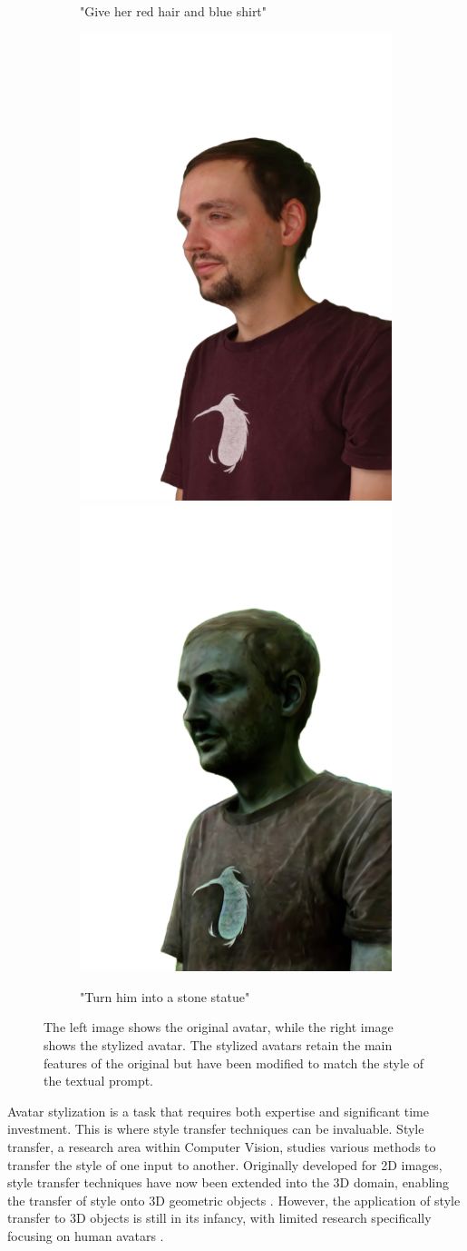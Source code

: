 \begin{figure}[ht]
\begin{subfigure}{0.40\linewidth}
		\caption{"Give her red hair and blue shirt"}
	\end{subfigure}
	\begin{subfigure}{0.40\linewidth}
		\includegraphics[width=0.45\linewidth]{Figures/results/initials/simon/27_render.png}
		\includegraphics[width=0.45\linewidth]{Figures/results/high/simon_stone/27_render.png}
		\caption{"Turn him into a stone statue"}
	\end{subfigure}
	\caption{The left image shows the original avatar, while the right image shows the stylized avatar. The stylized avatars retain the main features of the original but have been modified to match the style of the textual prompt.}
	\label{fig:introduction_stylization}
\end{figure}

Avatar stylization is a task that requires both expertise and significant time investment. This is where style transfer techniques can be invaluable. Style transfer, a research area within Computer Vision, studies various methods to transfer the style of one input to another. Originally developed for 2D images, style transfer techniques have now been extended into the 3D domain, enabling the transfer of style onto 3D geometric objects \citep{Li.2024, Han.2021}. However, the application of style transfer to 3D objects is still in its infancy, with limited research specifically focusing on human avatars \citep{Yin.2021, Segu.2020}.

